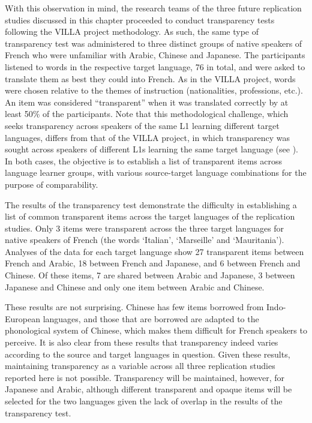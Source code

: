 \documentclass[output=paper,colorlinks,citecolor=brown,modfonts,nonflat]{../langscibook}
\begin{document}
With this observation in mind, the research teams of the three future replication studies discussed in this chapter proceeded to conduct transparency tests following the VILLA project methodology. As such, the same type of transparency test was administered to three distinct groups of native speakers of French who were unfamiliar with Arabic, Chinese and Japanese. The participants listened to words in the respective target language, 76 in total, and were asked to translate them as best they could into French. As in the VILLA project, words were chosen relative to the themes of instruction (nationalities, professions, etc.). An item was considered “transparent” when it was translated correctly by at least 50\% of the participants. Note that this methodological challenge, which seeks transparency across speakers of the same L1 learning different target languages, differs from that of the VILLA project, in which transparency was sought across speakers of different L1s learning the same target language (see ). In both cases, the objective is to establish a list of transparent items across language learner groups, with various source-target language combinations for the purpose of comparability.

The results of the transparency test demonstrate the difficulty in establishing a list of common transparent items across the target languages of the replication studies. Only 3 items were transparent across the three target languages for native speakers of French (the words ‘Italian’, ‘Marseille’ and ‘Mauritania’). Analyses of the data for each target language show 27 transparent items between French and Arabic, 18 between French and Japanese, and 6 between French and Chinese. Of these items, 7 are shared between Arabic and Japanese, 3 between Japanese and Chinese and only one item between Arabic and Chinese.

These results are not surprising. Chinese has few items borrowed from Indo-European languages, and those that are borrowed are adapted to the phonological system of Chinese, which makes them difficult for French speakers to perceive. It is also clear from these results that transparency indeed varies according to the source and target languages in question. Given these results, maintaining transparency as a variable across all three replication studies reported here is not possible. Transparency will be maintained, however, for Japanese and Arabic, although different transparent and opaque items will be selected for the two languages given the lack of overlap in the results of the transparency test.
\end{document}
